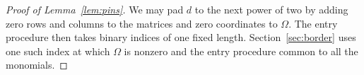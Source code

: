 \begin{proof}[Proof of Lemma~\ref{lem:pins}]
We may pad $d$ to the next power of two by adding zero rows and
columns to the matrices and zero coordinates to $\Omega$. The
entry procedure then takes binary indices of one fixed length.
Section~\ref{sec:border} uses one such index at which $\Omega$ is
nonzero and the entry procedure common to all the monomials.
\end{proof}
